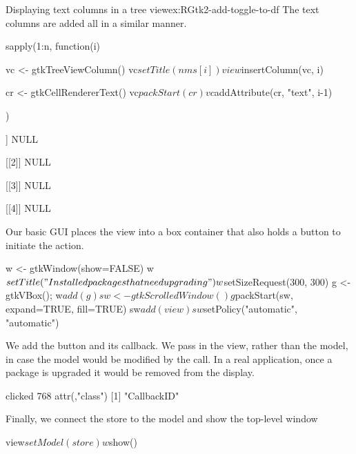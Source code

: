 \begin{example}{Displaying text columns in a tree view}{ex:RGtk2-add-toggle-to-df}
The text columns are added all in a similar manner.
\begin{Schunk}
\begin{Sinput}
 sapply(1:n, function(i) {
   vc <- gtkTreeViewColumn()
   vc$setTitle(nms[i])
   view$insertColumn(vc, i)
 
   cr <- gtkCellRendererText()
   vc$packStart(cr)
   vc$addAttribute(cr, "text", i-1)
 })
\end{Sinput}
\begin{Soutput}
[[1]]
NULL

[[2]]
NULL

[[3]]
NULL

[[4]]
NULL
\end{Soutput}
\end{Schunk}

Our basic GUI places the view into a box container that also holds a
button to initiate the action.
\begin{Schunk}
\begin{Sinput}
 w <- gtkWindow(show=FALSE)
 w$setTitle("Installed packages that need upgrading")
 w$setSizeRequest(300, 300)
 g <- gtkVBox(); w$add(g)
 sw <- gtkScrolledWindow()
 g$packStart(sw, expand=TRUE, fill=TRUE)
 sw$add(view)
 sw$setPolicy("automatic", "automatic")
\end{Sinput}
\end{Schunk}

We add the button and its callback. We pass in the view, rather than
the model, in case the model would be modified by the 
call. In a real application, once a package is upgraded it would be
removed from the display.
\begin{Schunk}
\begin{Soutput}
clicked 
    768 
attr(,"class")
[1] "CallbackID"
\end{Soutput}
\end{Schunk}

Finally, we connect the store to the model and show the top-level window
\begin{Schunk}
\begin{Sinput}
 view$setModel(store)
 w$show()
\end{Sinput}
\end{Schunk}
\end{example}
